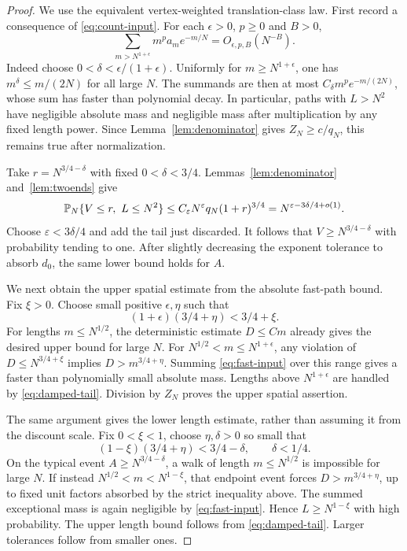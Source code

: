 \begin{proof}
We use the equivalent vertex-weighted translation-class law. First record a consequence of \eqref{eq:count-input}. For each $\epsilon>0$, $p\ge0$ and $B>0$,
\begin{equation}\label{eq:damped-tail}
 \sum_{m>N^{1+\epsilon}}m^p a_m e^{-m/N}=O_{\epsilon,p,B}(N^{-B}).
\end{equation}
Indeed choose $0<\delta<\epsilon/(1+\epsilon)$. Uniformly for $m\ge N^{1+\epsilon}$, one has $m^\delta\le m/(2N)$ for all large $N$. The summands are then at most $C_\delta m^p e^{-m/(2N)}$, whose sum has faster than polynomial decay. In particular, paths with $L>N^2$ have negligible absolute mass and negligible mass after multiplication by any fixed length power. Since Lemma~\ref{lem:denominator} gives $Z_N\ge c/q_N$, this remains true after normalization.

Take $r=N^{3/4-\delta}$ with fixed $0<\delta<3/4$. Lemmas~\ref{lem:denominator} and~\ref{lem:twoends} give
\[
 \mathbb P_N\{V\le r,\ L\le N^2\}
       \le C_\varepsilon N^\varepsilon q_N(1+r)^{3/4}
       =N^{\varepsilon-3\delta/4+o(1)}.
\]
Choose $\varepsilon<3\delta/4$ and add the tail just discarded. It follows that $V\ge N^{3/4-\delta}$ with probability tending to one. After slightly decreasing the exponent tolerance to absorb $d_0$, the same lower bound holds for $A$.

We next obtain the upper spatial estimate from the absolute fast-path bound. Fix $\xi>0$. Choose small positive $\epsilon,\eta$ such that
\[
 (1+\epsilon)(3/4+\eta)<3/4+\xi.
\]
For lengths $m\le N^{1/2}$, the deterministic estimate $D\le Cm$ already gives the desired upper bound for large $N$. For $N^{1/2}<m\le N^{1+\epsilon}$, any violation of $D\le N^{3/4+\xi}$ implies $D>m^{3/4+\eta}$. Summing \eqref{eq:fast-input} over this range gives a faster than polynomially small absolute mass. Lengths above $N^{1+\epsilon}$ are handled by \eqref{eq:damped-tail}. Division by $Z_N$ proves the upper spatial assertion.

The same argument gives the lower length estimate, rather than assuming it from the discount scale. Fix $0<\xi<1$, choose $\eta,\delta>0$ so small that
\[
 (1-\xi)(3/4+\eta)<3/4-\delta,
 \qquad \delta<1/4.
\]
On the typical event $A\ge N^{3/4-\delta}$, a walk of length $m\le N^{1/2}$ is impossible for large $N$. If instead $N^{1/2}<m<N^{1-\xi}$, that endpoint event forces $D>m^{3/4+\eta}$, up to fixed unit factors absorbed by the strict inequality above. The summed exceptional mass is again negligible by \eqref{eq:fast-input}. Hence $L\ge N^{1-\xi}$ with high probability. The upper length bound follows from \eqref{eq:damped-tail}. Larger tolerances follow from smaller ones.


\end{proof}
